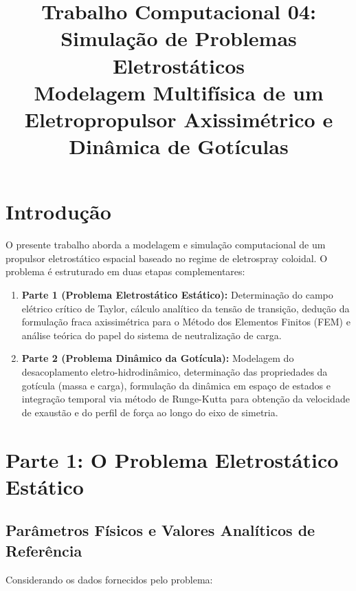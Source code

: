\documentclass[12pt,a4paper]{article}
\title{
    \textbf{Trabalho Computacional 04: Simulação de Problemas Eletrostáticos}
    \\[0.3cm]
    \large Modelagem Multifísica de um Eletropropulsor Axissimétrico e Dinâmica de Gotículas
}
\date{}
\begin{document}
\maketitle

\section{Introdução}

O presente trabalho aborda a modelagem e simulação computacional de um propulsor
eletrostático espacial baseado no regime de eletrospray coloidal. O problema é
estruturado em duas etapas complementares:

\begin{enumerate}
    \item \textbf{Parte 1 (Problema Eletrostático Estático):}
    Determinação do campo elétrico crítico de Taylor, cálculo analítico da tensão
    de transição, dedução da formulação fraca axissimétrica para o Método dos
    Elementos Finitos (FEM) e análise teórica do papel do sistema de neutralização
    de carga.

    \item \textbf{Parte 2 (Problema Dinâmico da Gotícula):}
    Modelagem do desacoplamento eletro-hidrodinâmico, determinação das propriedades
    da gotícula (massa e carga), formulação da dinâmica em espaço de estados e
    integração temporal via método de Runge-Kutta para obtenção da velocidade de
    exaustão e do perfil de força ao longo do eixo de simetria.
\end{enumerate}

\section{Parte 1: O Problema Eletrostático Estático}

\subsection{Parâmetros Físicos e Valores Analíticos de Referência}

Considerando os dados fornecidos pelo problema:
\end{document}
